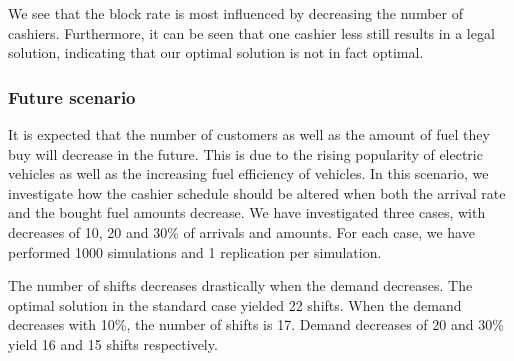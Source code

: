 We see that the block rate is most influenced by decreasing the number of cashiers.
Furthermore, it can be seen that one cashier less still results in a legal solution, indicating that our optimal solution is not in fact optimal.


\subsubsection{Future scenario}
It is expected that the number of customers as well as the amount of fuel they buy will decrease in the future.
This is due to the rising popularity of electric vehicles as well as the increasing fuel efficiency of vehicles.
In this scenario, we investigate how the cashier schedule should be altered when both the arrival rate and the bought fuel amounts decrease.
We have investigated three cases, with decreases of 10, 20 and 30\% of arrivals and amounts.
For each case, we have performed 1000 simulations and 1 replication per simulation.

The number of shifts decreases drastically when the demand decreases.
The optimal solution in the standard case yielded 22 shifts.
When the demand decreases with 10\%, the number of shifts is 17.
Demand decreases of 20 and 30\% yield 16 and 15 shifts respectively.